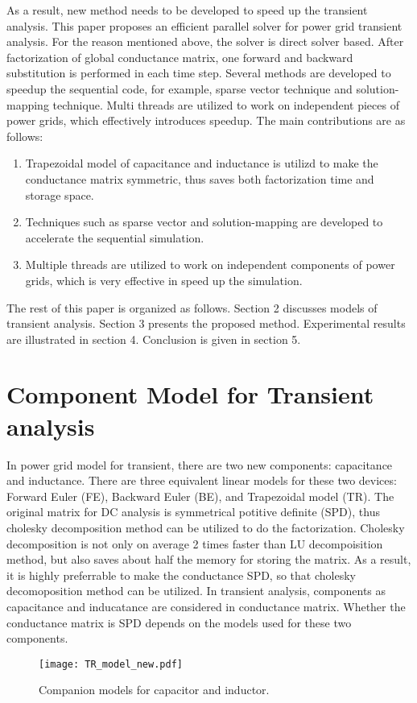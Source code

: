 \documentclass[conference]{IEEEtran}
\begin{document}
As a result, new method needs to be developed to speed up the transient analysis. This paper proposes an efficient parallel solver for 
power grid transient analysis. For the reason mentioned above, the solver is direct solver based. After factorization of global conductance
matrix, one forward and backward substitution is performed in each time step. Several methods are developed to speedup the sequential code, for example, sparse vector technique and solution-mapping technique. Multi threads are utilized to work on independent pieces of power 
grids, which effectively introduces speedup. The main contributions are as follows:
  \begin{enumerate}[1)]
  \item Trapezoidal model of capacitance and inductance is utilizd to make the conductance matrix symmetric, thus saves both factorization
	time and storage space.
  \item Techniques such as sparse vector and solution-mapping are developed to accelerate the sequential simulation.
  \item Multiple threads are utilized to work on independent components of power grids, which is very effective in speed up the 
	simulation.
  \end{enumerate} 

The rest of this paper is organized as follows. Section 2 discusses models of transient analysis. Section 3 presents the proposed method. 
Experimental results are illustrated in section 4. Conclusion is given in section 5.
 
\section{Component Model for Transient analysis}
In power grid model for transient, there are two new components: capacitance and inductance. There are three equivalent linear models for
these two devices: Forward Euler (FE), Backward Euler (BE), and Trapezoidal model (TR). The original matrix for DC analysis is symmetrical potitive definite (SPD), thus cholesky decomposition method can be utilized to do the factorization. Cholesky decomposition is not only
on average 2 times faster than LU decompoisition method, but also saves about half the memory for storing the matrix. As a result, it is
highly preferrable to make the conductance SPD, so that cholesky decomoposition method can be utilized. In transient 
analysis, components as capacitance and inducatance are considered in conductance matrix. Whether the conductance matrix is SPD depends on
the models used for these two components. 
\begin{figure*}[htbp]
  \centering
  \texttt{[image: TR\_model\_new.pdf]}
  \caption{Companion models for capacitor and inductor.}
  \label{TR_model}
\end{figure*}
\end{document}
